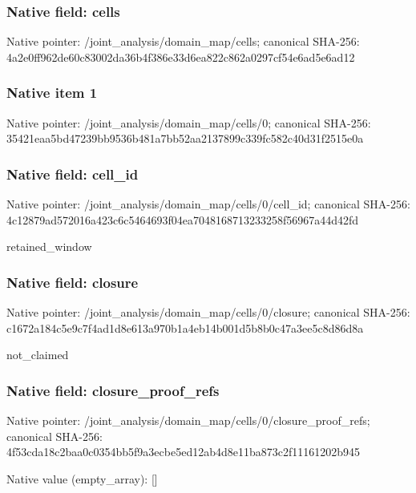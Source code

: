 \documentclass[10pt,a4paper]{article}
\begin{document}
\subsubsection{Native field: cells}
Native pointer: /joint\_\allowbreak{}analysis/domain\_\allowbreak{}map/cells; canonical SHA-256: 4a2e0ff962de60c83002da36b4f386e33d6ea822c862a0297cf54e6ad5e6ad12

\subsubsection{Native item 1}
Native pointer: /joint\_\allowbreak{}analysis/domain\_\allowbreak{}map/cells/0; canonical SHA-256: 35421eaa5bd47239bb9536b481a7bb52aa2137899c339fc582c40d31f2515e0a

\subsubsection{Native field: cell\_\allowbreak{}id}
Native pointer: /joint\_\allowbreak{}analysis/domain\_\allowbreak{}map/cells/0/cell\_\allowbreak{}id; canonical SHA-256: 4c12879ad572016a423c6c5464693f04ea7048168713233258f56967a44d42fd

\begingroup\raggedright\sloppy retained\_\allowbreak{}window\par\endgroup

\subsubsection{Native field: closure}
Native pointer: /joint\_\allowbreak{}analysis/domain\_\allowbreak{}map/cells/0/closure; canonical SHA-256: c1672a184c5e9c7f4ad1d8e613a970b1a4eb14b001d5b8b0c47a3ee5c8d86d8a

\begingroup\raggedright\sloppy not\_\allowbreak{}claimed\par\endgroup

\subsubsection{Native field: closure\_\allowbreak{}proof\_\allowbreak{}refs}
Native pointer: /joint\_\allowbreak{}analysis/domain\_\allowbreak{}map/cells/0/closure\_\allowbreak{}proof\_\allowbreak{}refs; canonical SHA-256: 4f53cda18c2baa0c0354bb5f9a3ecbe5ed12ab4d8e11ba873c2f11161202b945

Native value (empty\_\allowbreak{}array): []
\end{document}
